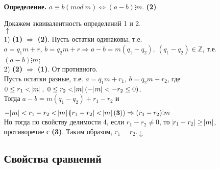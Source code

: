 \documentclass{article}
\begin{document}
    \textbf{Определение.} \( a \equiv b (mod\ m) \Leftrightarrow (a - b) \vdots m \). \textbf{(2)}

    Докажем эквивалентность определений 1 и 2.\\
    \( \uparrow \)\\
    1) \textbf{(1)} \( \Rightarrow \) \textbf{(2)}. Пусть остатки одинаковы, т.е. \( a = q_1m + r,\ b = q_2m + r \Rightarrow a - b = m(q_1 - q_2),\ (q_1 - q_2) \in \mathbb{Z} \), т.е. \( (a - b) \vdots m \);\\
    2) \textbf{(2)} \( \Rightarrow \) \textbf{(1)}. От противного.\\
    Пусть остатки разные, т.е. \( a = q_1m + r_1,\ b = q_2m + r_2 \), где \( 0 \leq r_1 < \abs{m},\ 0 \leq r_2 < \abs{m} (-\abs{m} < -r_2 \leq 0) \).\\
    Тогда \( a - b = m(q_1 - q_2) + r_1 - r_2 \) и \( -\abs{m} < r_1 - r_2 < \abs{m} (\abs{r_1 - r_2} < \abs{m} \mathbf{(3)}) \Rightarrow (r_1 - r_2) \vdots m \)\\
    Но тогда по свойству делимости 4, если \( r_1 - r_2 \neq 0 \), то \( \abs{r_1 - r_2} \geq \abs{m} \), противоречие с \textbf{(3)}. Таким образом, \(r_1 = r_2. \downarrow \)

    \subsection{Свойства сравнений}
\end{document}
